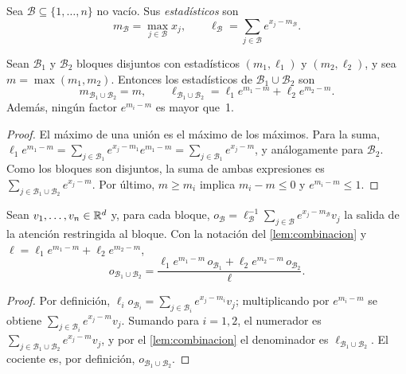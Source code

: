 \begin{definicion}
Sea $\mathcal{B}\subseteq\{1,\dots,n\}$ no vacío. Sus \emph{estadísticos} son
\[
m_{\mathcal{B}}=\max_{j\in\mathcal{B}}x_j,\qquad \ell_{\mathcal{B}}=\sum_{j\in\mathcal{B}}e^{x_j-m_{\mathcal{B}}}.
\]
\end{definicion}

\begin{lema}\label{lem:combinacion}
Sean $\mathcal{B}_1$ y $\mathcal{B}_2$ bloques disjuntos con estadísticos $(m_1,\ell_1)$ y $(m_2,\ell_2)$, y sea $m=\max(m_1,m_2)$. Entonces los estadísticos de $\mathcal{B}_1\cup\mathcal{B}_2$ son
\[
m_{\mathcal{B}_1\cup\mathcal{B}_2}=m,\qquad \ell_{\mathcal{B}_1\cup\mathcal{B}_2}=\ell_1e^{m_1-m}+\ell_2e^{m_2-m}.
\]
Además, ningún factor $e^{m_i-m}$ es mayor que~1.
\end{lema}

\begin{proof}
El máximo de una unión es el máximo de los máximos. Para la suma, $\ell_1e^{m_1-m}=\sum_{j\in\mathcal{B}_1}e^{x_j-m_1}e^{m_1-m}=\sum_{j\in\mathcal{B}_1}e^{x_j-m}$, y análogamente para $\mathcal{B}_2$. Como los bloques son disjuntos, la suma de ambas expresiones es $\sum_{j\in\mathcal{B}_1\cup\mathcal{B}_2}e^{x_j-m}$. Por último, $m\ge m_i$ implica $m_i-m\le 0$ y $e^{m_i-m}\le 1$.
\end{proof}

\begin{proposicion}\label{prop:combinacion-salida}
Sean $v_1,\dots,v_n\in\mathbb{R}^{d}$ y, para cada bloque, $o_{\mathcal{B}}=\ell_{\mathcal{B}}^{-1}\sum_{j\in\mathcal{B}}e^{x_j-m_{\mathcal{B}}}v_j$ la salida de la atención restringida al bloque. Con la notación del \cref{lem:combinacion} y $\ell=\ell_1e^{m_1-m}+\ell_2e^{m_2-m}$,
\[
o_{\mathcal{B}_1\cup\mathcal{B}_2}=\frac{\ell_1e^{m_1-m}\,o_{\mathcal{B}_1}+\ell_2e^{m_2-m}\,o_{\mathcal{B}_2}}{\ell}.
\]
\end{proposicion}

\begin{proof}
Por definición, $\ell_io_{\mathcal{B}_i}=\sum_{j\in\mathcal{B}_i}e^{x_j-m_i}v_j$; multiplicando por $e^{m_i-m}$ se obtiene $\sum_{j\in\mathcal{B}_i}e^{x_j-m}v_j$. Sumando para $i=1,2$, el numerador es $\sum_{j\in\mathcal{B}_1\cup\mathcal{B}_2}e^{x_j-m}v_j$, y por el \cref{lem:combinacion} el denominador es $\ell_{\mathcal{B}_1\cup\mathcal{B}_2}$. El cociente es, por definición, $o_{\mathcal{B}_1\cup\mathcal{B}_2}$.
\end{proof}

